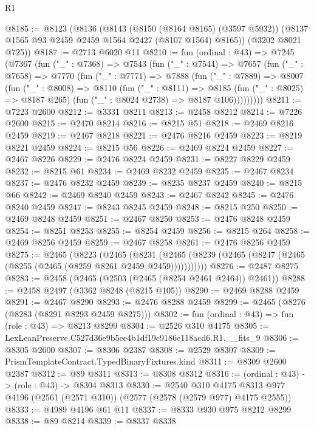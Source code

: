\begin{lexlean}{R1}
\begin{coremodule}
@8185 := @8123
    (@8136
      (@8143
        (@8150 (@8164 @8165) (@3597 @5932))
        (@8137 @1565 @93 @2459 @2459 @1564 @2427 (@8107 @1564) @8165))
      (@3202 @8021 @725))
@8187 := @2713 @6020 @11
@8210 := fun (ordinal : @43) =>
  @7245
    (@7367
      (fun ("_" : @7368) =>
      @7543
        (fun ("_" : @7544) =>
        @7657
          (fun ("_" : @7658) =>
          @7770
            (fun ("_" : @7771) =>
            @7888
              (fun ("_" : @7889) =>
              @8007
                (fun ("_" : @8008) =>
                @8110
                  (fun ("_" : @8111) =>
                  @8185
                    (fun ("_" : @8025) => @8187 @265)
                    (fun ("_" : @8024 @2738) => @8187 @106)))))))))
@8211 := @7223 @2600
@8212 := @3331 @8211
@8213 := @2458 @8212
@8214 := @7226 @2600
@8215 := @2470 @8214
@8216 := @8215 @51
@8218 := @2469 @8216 @2459
@8219 := @2467 @8218
@8221 := @2476 @8216 @2459
@8223 := @8219 @8221 @2459
@8224 := @8215 @56
@8226 := @2469 @8224 @2459
@8227 := @2467 @8226
@8229 := @2476 @8224 @2459
@8231 := @8227 @8229 @2459
@8232 := @8215 @61
@8234 := @2469 @8232 @2459
@8235 := @2467 @8234
@8237 := @2476 @8232 @2459
@8239 := @8235 @8237 @2459
@8240 := @8215 @66
@8242 := @2469 @8240 @2459
@8243 := @2467 @8242
@8245 := @2476 @8240 @2459
@8247 := @8243 @8245 @2459
@8248 := @8215 @250
@8250 := @2469 @8248 @2459
@8251 := @2467 @8250
@8253 := @2476 @8248 @2459
@8254 := @8251 @8253
@8255 := @8254 @2459
@8256 := @8215 @264
@8258 := @2469 @8256 @2459
@8259 := @2467 @8258
@8261 := @2476 @8256 @2459
@8275 := @2465
    (@8223
      (@2465
        (@8231 (@2465 (@8239 (@2465 (@8247 (@2465 (@8255 (@2465 (@8259 @8261 @2459 @2459)))))))))))
@8276 := @2487 @8275
@8283 := @2458 (@2465 (@2503 (@2465 (@8254 @2461 @2464)) @2461))
@8288 := @2458 @2497 (@3362 @8248 (@8215 @105))
@8290 := @2469 @8288 @2459
@8291 := @2467 @8290
@8293 := @2476 @8288 @2459
@8299 := @2465 (@8276 (@8283 (@8291 @8293 @2459 @8275)))
@8302 := fun (ordinal : @43) => fun (role : @43) => @8213 @8299
@8304 := @2526 @310 @4175
@8305 := LexLeanPreserve.C527d36e9b5ee4b1df19c9186e118acd6.R1.__fits_9
@8306 := @8305 @2600
@8307 := @8306 @2387
@8308 := @2529 @8307
@8309 := PrismTemplateContract.TypedBinaryFixtures.kind
@8311 := @8309 @2600 @2387
@8312 := @89 @8311
@8313 := @8308 @8312
@8316 := (ordinal : @43) -> (role : @43) -> @8304 @8313
@8330 := @2540
    @310
    @4175
    @8313
    @977
    @4196
    (@2561 (@2571 @310))
    (@2577 (@2578 (@2579 @977) @4175 @2555))
@8333 := @4989 @4196 @61 @11
@8337 := @8333 @930 @975 @8212 @8299
@8338 := @89 @8214
@8339 := @8337 @8338

\end{coremodule}
\end{lexlean}
